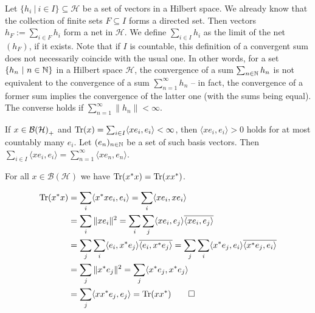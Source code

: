 \begin{remark}
  Let $\{h_i\ |\ i \in I\} \subseteq \mathcal{H}$ be a set of vectors in a Hilbert space. 
  We already know that the collection of finite sets $F \subseteq I$ forms a directed set.
  Then vectors $h_F := \sum_{i \in F} h_i$ form a net in $\mathcal{H}$.
  We define $\sum_{i \in I} h_i$ as the limit of the net $(h_F)$, if it exists.
  Note that if $I$ is countable, this definition of a convergent sum does not necessarily
  coincide with the usual one. In other words, for a set $\{h_n\ |\ n \in \mathbb {N}\}$ in a Hilbert space $\mathcal{H}$, the convergence of a sum
  $\sum_{n \in \mathbb {N}} h_n$ is not equivalent to the convergence of a sum $\sum_{n = 1} ^\infty h_n$ -- in fact, the convergence of a former sum implies the convergence of the latter one (with the sums being equal).
  The converse holds if $\sum_{n = 1} ^\infty \| h_n\| < \infty$.
\end{remark}

\begin{remark}
  If $x \in \operatorname{\mathcal{B} (\mathcal{H})}_+$ and $\operatorname{Tr}(x) = \sum_{i \in I} \langle xe_i, e_i\rangle < \infty$, then $\langle xe_i, e_i\rangle > 0$ holds for at most 
  countably many $e_i$. Let $(e_n)_{n \in \mathbb {N}}$ be a set of such basis vectors.
  Then $\sum_{i \in I} \langle x e_i, e_i\rangle = \sum_{n = 1} ^\infty \langle xe_n, e_n\rangle$.
\end{remark}

\begin{lemma}\label{lem:4.2}
  For all $x \in \mathcal{B}(\mathcal{H})$ we have $\operatorname{Tr} (x^* x) = \operatorname{Tr}(x x^*)$.
\end{lemma}

\begin{myproof}
  \begin{align*}
    \operatorname{Tr} (x^* x) &= \sum_i \langle x^* x e_i , e_i\rangle = \sum_i \langle x e_i, x e_i \rangle\\
    &= \sum_i \| x e_i\|^2 = \sum_i \sum_j \langle x e_i, e_j \rangle \overline{\langle x e_i, e_j \rangle}\\
    &= \sum_j \sum_i \langle e_i, x^* e_j \rangle \overline{\langle e_i, x^* e_j \rangle} = \sum_j \sum_i \langle x^* e_j, e_i\rangle \overline{\langle x^* e_j , e_i\rangle}\\
    &= \sum_j \| x^* e_j \|^2 = \sum_j \langle x^* e_j, x^* e_j\rangle\\
    &= \sum_j \langle x x^* e_j, e_j \rangle = \operatorname{Tr}(x x^*) \qedhere
  \end{align*}
\end{myproof}

